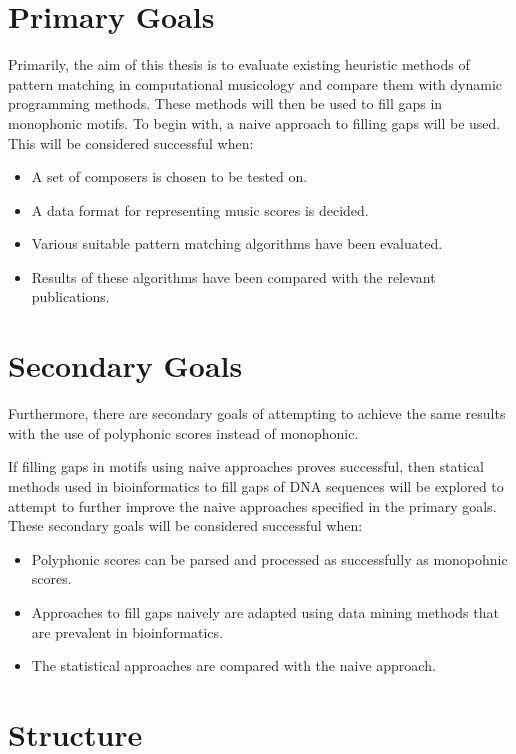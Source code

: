 \section{Primary Goals}

Primarily, the aim of this thesis is to evaluate existing heuristic methods of pattern matching in computational musicology and compare them with dynamic programming methods. These methods will then be used to fill gaps in monophonic motifs. To begin with, a naive approach to filling gaps will be used. This will be considered successful when:

\begin{itemize}
    \item A set of composers is chosen to be tested on.
    \item A data format for representing music scores is decided.
    \item Various suitable pattern matching algorithms have been evaluated.
    \item Results of these algorithms have been compared with the relevant publications.
\end{itemize}

\section{Secondary Goals}

Furthermore, there are secondary goals of attempting to achieve the same results with the use of polyphonic scores instead of monophonic.

If filling gaps in motifs using naive approaches proves successful, then statical methods used in bioinformatics to fill gaps of DNA sequences will be explored to attempt to further improve the naive approaches specified in the primary goals. These secondary goals will be considered successful when:

\begin{itemize}
    \item Polyphonic scores can be parsed and processed as successfully as monopohnic scores.
    \item Approaches to fill gaps naively are adapted using data mining methods that are prevalent in bioinformatics.
    \item The statistical approaches are compared with the naive approach.
\end{itemize}


\section{Structure}
